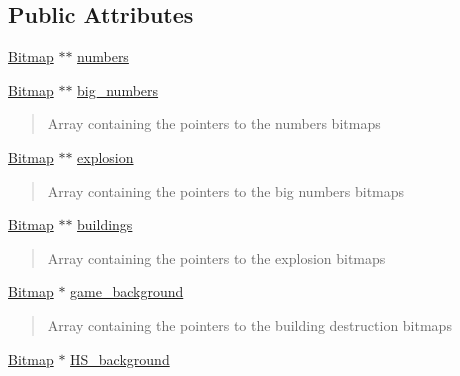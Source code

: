 \subsection*{Public Attributes}
\begin{DoxyCompactItemize}
\item 
\hyperlink{struct_bitmap}{Bitmap} $\ast$$\ast$ \hyperlink{struct_b_m_ps_holder__t_abf522b5ab7fa5ca09282b2b6ce8efe2b}{numbers}
\item 
\hyperlink{struct_bitmap}{Bitmap} $\ast$$\ast$ \hyperlink{struct_b_m_ps_holder__t_a5c1aac4b756c7caaadd1e857cc168c3a}{big\+\_\+numbers}
\begin{DoxyCompactList}\small\item\em \begin{quote}
Array containing the pointers to the numbers bitmaps \end{quote}
\end{DoxyCompactList}\item 
\hyperlink{struct_bitmap}{Bitmap} $\ast$$\ast$ \hyperlink{struct_b_m_ps_holder__t_adf9a39188fb506844694ba403d97e4a1}{explosion}
\begin{DoxyCompactList}\small\item\em \begin{quote}
Array containing the pointers to the big numbers bitmaps \end{quote}
\end{DoxyCompactList}\item 
\hyperlink{struct_bitmap}{Bitmap} $\ast$$\ast$ \hyperlink{struct_b_m_ps_holder__t_a71756da7b641decbe1333acdb01b05ee}{buildings}
\begin{DoxyCompactList}\small\item\em \begin{quote}
Array containing the pointers to the explosion bitmaps \end{quote}
\end{DoxyCompactList}\item 
\hyperlink{struct_bitmap}{Bitmap} $\ast$ \hyperlink{struct_b_m_ps_holder__t_a25d808b859252665b213d2b1430d521a}{game\+\_\+background}
\begin{DoxyCompactList}\small\item\em \begin{quote}
Array containing the pointers to the building destruction bitmaps \end{quote}
\end{DoxyCompactList}\item 
\hyperlink{struct_bitmap}{Bitmap} $\ast$ \hyperlink{struct_b_m_ps_holder__t_a2f28777b77117387410c5e20ff925c44}{H\+S\+\_\+background}

\end{DoxyCompactItemize}
